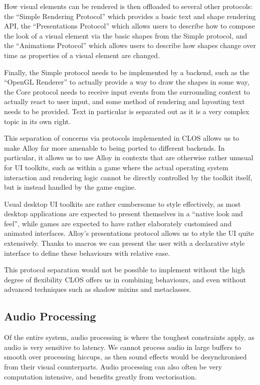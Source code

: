 \documentclass[format=sigconf]{acmart}
\begin{document}
How visual elements can be rendered is then offloaded to several other protocols: the ``Simple Rendering Protocol'' which provides a basic text and shape rendering API, the ``Presentations Protocol'' which allows users to describe how to compose the look of a visual element via the basic shapes from the Simple protocol, and the ``Animations Protocol'' which allows users to describe how shapes change over time as properties of a visual element are changed.

Finally, the Simple protocol needs to be implemented by a backend, such as the ``OpenGL Renderer'' to actually provide a way to draw the shapes in some way, the Core protocol needs to receive input events from the surrounding context to actually react to user input, and some method of rendering and layouting text needs to be provided. Text in particular is separated out as it is a very complex topic in its own right.

This separation of concerns via protocols implemented in CLOS allows us to make Alloy far more amenable to being ported to different backends. In particular, it allows us to use Alloy in contexts that are otherwise rather unusual for UI toolkits, such as within a game where the actual operating system interaction and rendering logic cannot be directly controlled by the toolkit itself, but is instead handled by the game engine.

Usual desktop UI toolkits are rather cumbersome to style effectively, as most desktop applications are expected to present themselves in a ``native look and feel'', while games are expected to have rather elaborately customised and animated interfaces. Alloy's presentations protocol allows us to style the UI quite extensively. Thanks to macros we can present the user with a declarative style interface to define these behaviours with relative ease.

This protocol separation would not be possible to implement without the high degree of flexibility CLOS offers us in combining behaviours, and even without advanced techniques such as shadow mixins and metaclasses.

\subsection{Audio Processing}\label{audio}
Of the entire system, audio processing is where the toughest constraints apply, as audio is very sensitive to latency. We cannot process audio in large buffers to smooth over processing hiccups, as then sound effects would be desynchronised from their visual counterparts. Audio processing can also often be very computation intensive, and benefits greatly from vectorisation.
\end{document}
